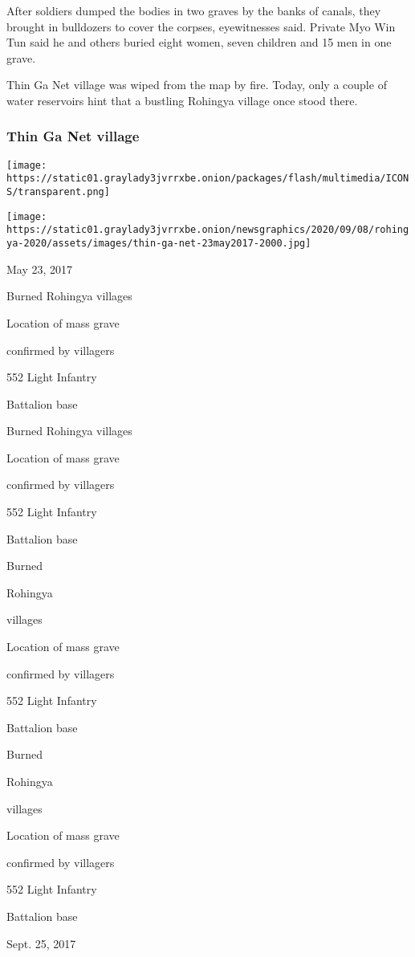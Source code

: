 After soldiers dumped the bodies in two graves by the banks of canals,
they brought in bulldozers to cover the corpses, eyewitnesses said.
Private Myo Win Tun said he and others buried eight women, seven
children and 15 men in one grave.

Thin Ga Net village was wiped from the map by fire. Today, only a couple
of water reservoirs hint that a bustling Rohingya village once stood
there.

\hypertarget{thin-ga-net-village}{%
\subsubsection{Thin Ga Net village}\label{thin-ga-net-village}}

\texttt{[image: https://static01.graylady3jvrrxbe.onion/packages/flash/multimedia/ICONS/transparent.png]}

\texttt{[image: https://static01.graylady3jvrrxbe.onion/newsgraphics/2020/09/08/rohingya-2020/assets/images/thin-ga-net-23may2017-2000.jpg]}

May 23, 2017

Burned Rohingya villages

Location of mass grave

confirmed by villagers

552 Light Infantry

Battalion base

Burned Rohingya villages

Location of mass grave

confirmed by villagers

552 Light Infantry

Battalion base

Burned

Rohingya

villages

Location of mass grave

confirmed by villagers

552 Light Infantry

Battalion base

Burned

Rohingya

villages

Location of mass grave

confirmed by villagers

552 Light Infantry

Battalion base

Sept. 25, 2017

